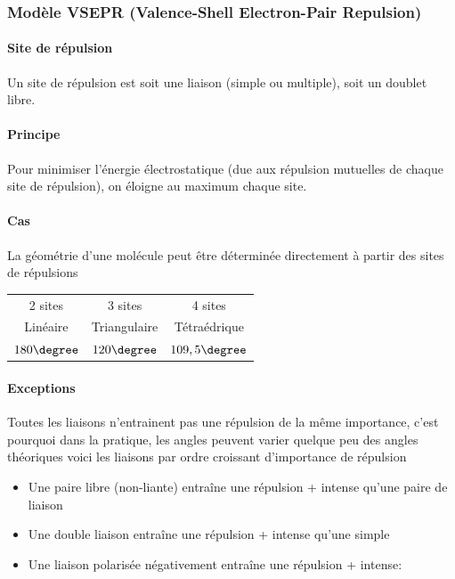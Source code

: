 \documentclass[11pt,a4paper,french]{article}
\begin{document}
\subsubsection{Modèle VSEPR (Valence-Shell Electron-Pair Repulsion)}
\paragraph{Site de répulsion}
Un site de répulsion est soit une liaison (simple ou multiple), soit un doublet libre.

\paragraph{Principe}
Pour minimiser l'énergie électrostatique (due aux répulsion mutuelles de chaque site de répulsion), on éloigne au maximum chaque site.

\paragraph{Cas}
La géométrie d'une molécule peut être déterminée directement à partir des sites de répulsions
\begin{center}
	\begin{tabular}{ccc}
		2 sites & 3 sites & 4 sites\\
		Linéaire & Triangulaire & Tétraédrique\\
		$180\degree$ & $120\degree$ & $109,5\degree$\\
	\end{tabular}
\end{center}

\paragraph{Exceptions}
Toutes les liaisons n'entrainent pas une répulsion de la même importance, c'est pourquoi dans la pratique, les angles peuvent varier quelque peu des angles théoriques voici les liaisons par ordre croissant d'importance de répulsion
\begin{itemize}
	\item Une paire libre (non-liante) entraîne une répulsion + intense qu'une paire de liaison
	\item Une double liaison entraîne une répulsion + intense qu'une simple
	\item Une liaison polarisée négativement entraîne une répulsion + intense:
		\begin{center}
		\end{center}
\end{itemize}
\end{document}
